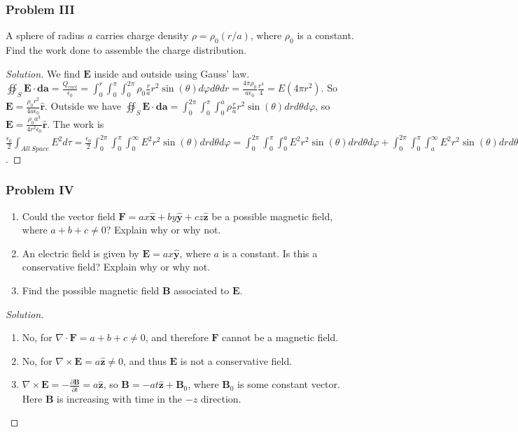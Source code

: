 \documentclass[oneside]{book}
\theoremstyle{definition}
\newcommand*\B[1]{\mathbf{#1}}
\newcommand*\Bh[1]{\mathbf{\hat{#1}}}
\begin{document}
\subsubsection{Problem III}
A sphere of radius $a$ carries charge density $\rho = \rho_0(r/a)$, where $\rho_0$ is a constant. Find the work done to assemble the charge distribution.
\begin{proof}[Solution]
We find $\B{E}$ inside and outside using Gauss' law. $\oiint_{S} \B{E}\cdot \B{da} = \frac{Q_{encl}}{\epsilon_0} = \int_{0}^{r}\int_{0}^{\pi} \int_{0}^{2\pi} \rho_0 \frac{r}{a}r^2\sin(\theta)d\varphi d\theta dr = \frac{4\pi \rho_0}{a \epsilon_0}\frac{r^4}{4} = E(4\pi r^2)$. So $\B{E} = \frac{\rho_0 r^2}{4a\epsilon_0}\Bh{r}$. Outside we have $\oiint_{S} \B{E}\cdot \B{da} = \int_{0}^{2\pi}\int_{0}^{\pi} \int_{0}^{a} \rho \frac{r}{a}r^2 \sin(\theta) dr d\theta d\varphi$, so $\B{E} = \frac{\rho_0 a^3}{4r^2 \epsilon_0}\Bh{r}$. The work is $\frac{\epsilon_0}{2}\int_{All\ Space}E^2 d\tau = \frac{\epsilon_0}{2}\int_{0}^{2\pi}\int_{0}^{\pi}\int_{0}^{\infty} E^2 r^2\sin(\theta) drd\theta d\varphi = \int_{0}^{2\pi}\int_{0}^{\pi}\int_{0}^{a} E^2r^2\sin(\theta)dr d\theta d\varphi + \int_{0}^{2\pi}\int_{0}^{\pi}\int_{a}^{\infty} E^2r^2\sin(\theta)drd\theta d\varphi = \frac{\pi \rho_0^2 a^5}{7\epsilon_0}$.
\end{proof}

\subsubsection{Problem IV}

\begin{enumerate}
\item Could the vector field $\B{F} = ax\Bh{x}+by\Bh{y}+cz\Bh{z}$ be a possible magnetic field, where $a+b+c\ne 0$? Explain why or why not.
\item An electric field is given by $\B{E} = ax\Bh{y}$, where $a$ is a constant. Is this a conservative field? Explain why or why not.
\item Find the possible magnetic field $\B{B}$ associated to $\B{E}$. 
\end{enumerate}
\begin{proof}[Solution]
\
\begin{enumerate}
\item No, for $\nabla \cdot \B{F} = a+b+c \ne 0$, and therefore $\B{F}$ cannot be a magnetic field.
\item No, for $\nabla \times \B{E} = a\Bh{z} \ne 0$, and thus $\B{E}$ is not a conservative field.
\item $\nabla \times \B{E} = -\frac{\partial \B{B}}{\partial t} = a\Bh{z}$, so $\B{B} = -at\Bh{z}+\B{B}_0$, where $\B{B}_0$ is some constant vector. Here $\B{B}$ is increasing with time in the $-z$ direction.
\end{enumerate}
\end{proof}
\end{document}
